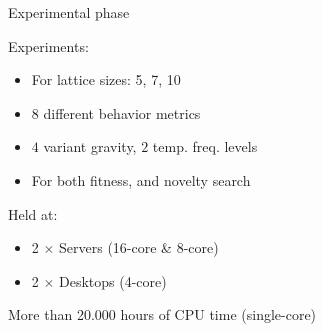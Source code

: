 \documentclass[6pt]{beamer}
\begin{document}

\begin{frame}{Experimental phase}
\begin{block}{Experiments:}
\begin{itemize}
\item For lattice sizes: 5, 7, 10
\item $8$ different behavior metrics
\item $4$ variant gravity, $2$ temp. freq. levels
\item For both fitness, and novelty search
\end{itemize}
\end{block}
\begin{block}{Held at:}
\begin{itemize}
\item 2 $\times$ Servers (16-core \& 8-core)
\item 2 $\times$ Desktops (4-core)
\end{itemize}
\end{block}
\alert{More than 20.000 hours of CPU time (single-core)}
\end{frame}
\end{document}

